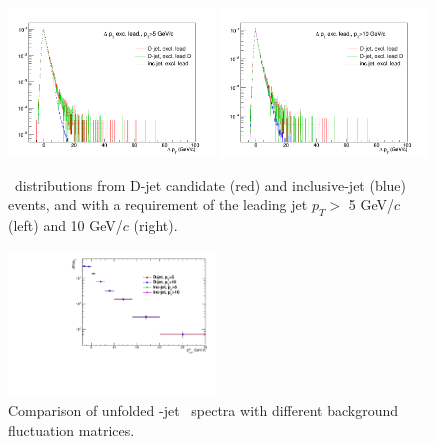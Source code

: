\begin{figure}[bth]
\centering
\includegraphics[width=0.49\textwidth]{pPbplots/unfolding/hDeltaPt_ptleadbin5_exlcuding_exlD}
\includegraphics[width=0.49\textwidth]{pPbplots/unfolding/hDeltaPt_ptleadbin10_exlcuding_exlD}
\caption{ \deltapt\ distributions from D-jet candidate (red) and inclusive-jet (blue) events, and with a requirement of the leading jet $p_{T}>$ 5 GeV/$c$ (left) and 10 GeV/$c$ (right).}
\label{fig:DeltaPtSys}
\end{figure}

\begin{figure}[bth]
\centering
\includegraphics[width=0.49\textwidth]{pPbplots/unfolding/jetSpectra_afterUnfolding_bkgFlucSys}
\caption{ Comparison of unfolded \Dstar-jet \pt\ spectra with different background fluctuation matrices.}
\label{fig:BkgFlucSpec}
\end{figure}


